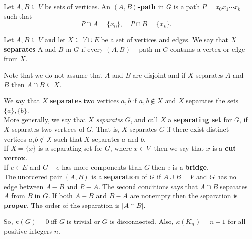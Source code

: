Let \(A, B \subseteq V\) be sets of vertices. An \textbf{\((A, B)\)-path} in \(G\) is a path \(P = x_0x_1 \cdots x_k\) such that
\[P \cap A = \{x_0\}, \quad P \cap B = \{x_k\}.\]

Let \(A, B \subseteq V\) and let \(X \subseteq V \cup E\) be a set of vertices and edges. We say that \(X\) \textbf{separates} A and \(B\) in \(G\) if every \((A, B)-\)path in \(G\) contains a vertex or edge from \(X\).

Note that we do not assume that \(A\) and \(B\) are disjoint and if \(X\) separates \(A\) and \(B\) then \(A \cap B \subseteq X\).

We say that \(X\) \textbf{separates} two vertices \(a, b\) if \(a, b \notin X\) and \(X\) separates the sets \(\{a\}, \{b\}\). \\

More generally, we say that \(X\) \textit{separates} \(G\), and call \(X\) a \textbf{separating set} for \(G\), if \(X\) separates two vertices of \(G\). That is, \(X\) separates \(G\) if there exist distinct vertices \(a, b \notin X\) such that \(X\) separates \(a\) and \(b\). \\

If \(X = \{x\}\) is a separating set for \(G\), where \(x \in V\), then we say that \(x\) is a \textbf{cut vertex}. \\

If \(e \in E\) and \(G - e\) has more components than \(G\) then \(e\) is a \textbf{bridge}. \\

The unordered pair \((A, B)\) is a \textbf{separation} of \(G\) if \(A \cup B = V\) and \(G\) has no edge between \(A - B\) and \(B - A\). The second conditions says that \(A \cap B\) separates \(A\) from \(B\) in \(G\). If both \(A - B\) and \(B - A\) are nonempty then the separation is \textbf{proper}. The order of the separation is \(|A \cap B|\).


\bigskip
So, \(\kappa(G) = 0\) iff \(G\) is trivial or \(G\) is disconnected. Also, \(\kappa(K_n) = n - 1\) for all positive integers \(n\).

